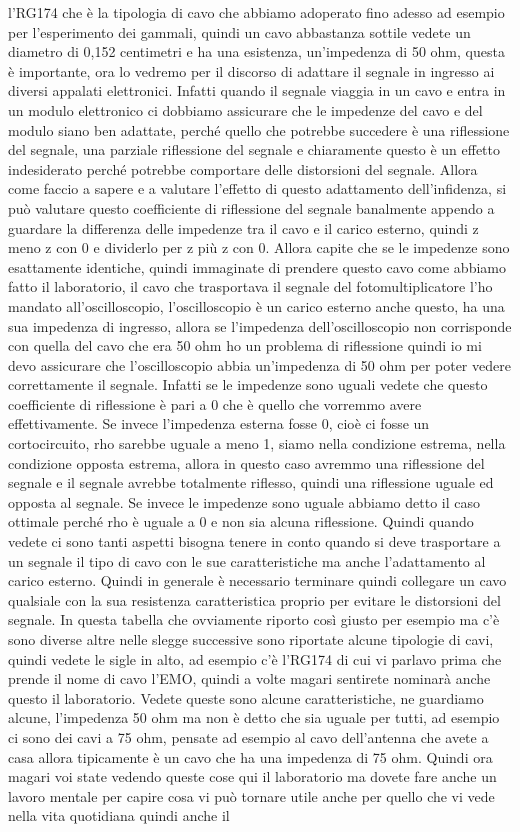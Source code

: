 l'RG174 che è la tipologia di cavo che abbiamo adoperato fino adesso ad esempio per l'esperimento dei gammali, quindi un cavo abbastanza sottile vedete un diametro di 0,152 centimetri e ha una esistenza, un'impedenza di 50 ohm, questa è importante, ora lo vedremo per il discorso di adattare il segnale in ingresso ai diversi appalati elettronici. Infatti quando il segnale viaggia in un cavo e entra in un modulo elettronico ci dobbiamo assicurare che le impedenze del cavo e del modulo siano ben adattate, perché quello che potrebbe succedere è una riflessione del segnale, una parziale riflessione del segnale e chiaramente questo è un effetto indesiderato perché potrebbe comportare delle distorsioni del segnale. Allora come faccio a sapere e a valutare l'effetto di questo adattamento dell'infidenza, si può valutare questo coefficiente di riflessione del segnale banalmente appendo a guardare la differenza delle impedenze tra il cavo e il carico esterno, quindi z meno z con 0 e dividerlo per z più z con 0. Allora capite che se le impedenze sono esattamente identiche, quindi immaginate di prendere questo cavo come abbiamo fatto il laboratorio, il cavo che trasportava il segnale del fotomultiplicatore l'ho mandato all'oscilloscopio, l'oscilloscopio è un carico esterno anche questo, ha una sua impedenza di ingresso, allora se l'impedenza dell'oscilloscopio non corrisponde con quella del cavo che era 50 ohm ho un problema di riflessione quindi io mi devo assicurare che l'oscilloscopio abbia un'impedenza di 50 ohm per poter vedere correttamente il segnale. Infatti se le impedenze sono uguali vedete che questo coefficiente di riflessione è pari a 0 che è quello che vorremmo avere effettivamente. Se invece l'impedenza esterna fosse 0, cioè ci fosse un cortocircuito, rho sarebbe uguale a meno 1, siamo nella condizione estrema, nella condizione opposta estrema, allora in questo caso avremmo una riflessione del segnale e il segnale avrebbe totalmente riflesso, quindi una riflessione uguale ed opposta al segnale. Se invece le impedenze sono uguale abbiamo detto il caso ottimale perché rho è uguale a 0 e non sia alcuna riflessione. Quindi quando vedete ci sono tanti aspetti bisogna tenere in conto quando si deve trasportare a un segnale il tipo di cavo con le sue caratteristiche ma anche l'adattamento al carico esterno. Quindi in generale è necessario terminare quindi collegare un cavo qualsiale con la sua resistenza caratteristica proprio per evitare le distorsioni del segnale. In questa tabella che ovviamente riporto così giusto per esempio ma c'è sono diverse altre nelle slegge successive sono riportate alcune tipologie di cavi, quindi vedete le sigle in alto, ad esempio c'è l'RG174 di cui vi parlavo prima che prende il nome di cavo l'EMO, quindi a volte magari sentirete nominarà anche questo il laboratorio. Vedete queste sono alcune caratteristiche, ne guardiamo alcune, l'impedenza 50 ohm ma non è detto che sia uguale per tutti, ad esempio ci sono dei cavi a 75 ohm, pensate ad esempio al cavo dell'antenna che avete a casa allora tipicamente è un cavo che ha una impedenza di 75 ohm. Quindi ora magari voi state vedendo queste cose qui il laboratorio ma dovete fare anche un lavoro mentale per capire cosa vi può tornare utile anche per quello che vi vede nella vita quotidiana quindi anche il 